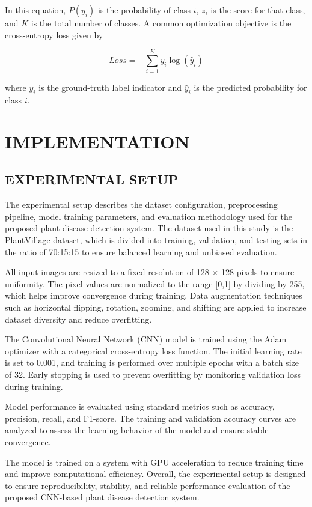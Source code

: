 \documentclass[12pt]{report}
\begin{document}
In this equation, $P(y_i)$ is the probability of class $i$, $z_i$ is the score for that class, and $K$ is the total number of classes. A common optimization objective is the cross-entropy loss given by

\begin{equation}
Loss = -\sum_{i=1}^{K} y_i \log(\hat{y}_i)
\end{equation}

where $y_i$ is the ground-truth label indicator and $\hat{y}_i$ is the predicted probability for class $i$.
\chapter{IMPLEMENTATION}

\section{EXPERIMENTAL SETUP}

The experimental setup describes the dataset configuration, preprocessing pipeline, model training parameters, and evaluation methodology used for the proposed plant disease detection system. The dataset used in this study is the PlantVillage dataset, which is divided into training, validation, and testing sets in the ratio of 70:15:15 to ensure balanced learning and unbiased evaluation.

All input images are resized to a fixed resolution of 128 $\times$ 128 pixels to ensure uniformity. The pixel values are normalized to the range [0,1] by dividing by 255, which helps improve convergence during training. Data augmentation techniques such as horizontal flipping, rotation, zooming, and shifting are applied to increase dataset diversity and reduce overfitting.

The Convolutional Neural Network (CNN) model is trained using the Adam optimizer with a categorical cross-entropy loss function. The initial learning rate is set to 0.001, and training is performed over multiple epochs with a batch size of 32. Early stopping is used to prevent overfitting by monitoring validation loss during training.

Model performance is evaluated using standard metrics such as accuracy, precision, recall, and F1-score. The training and validation accuracy curves are analyzed to assess the learning behavior of the model and ensure stable convergence.

The model is trained on a system with GPU acceleration to reduce training time and improve computational efficiency. Overall, the experimental setup is designed to ensure reproducibility, stability, and reliable performance evaluation of the proposed CNN-based plant disease detection system.
\end{document}
